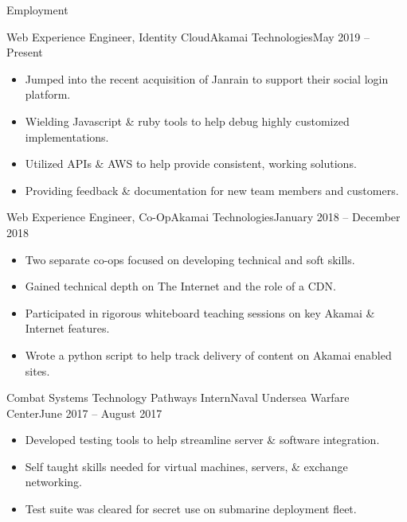 \documentclass[]{mcdowellcv}
\begin{document}
	\makeheader
	
	\begin{cvsection}{Employment}
		\begin{cvsubsection}{Web Experience Engineer, Identity Cloud}{Akamai Technologies}{May 2019 -- Present}
		\vspace{2mm}		
			\begin{itemize}
				\item Jumped into the recent acquisition of Janrain to support their social login platform.
				\item Wielding Javascript \& ruby tools to help debug highly customized implementations.
				\item Utilized APIs \& AWS to help provide consistent, working solutions.
				\item Providing feedback \& documentation for new team members and customers.
			\end{itemize}
		\end{cvsubsection}
		
		\begin{cvsubsection}{Web Experience Engineer, Co-Op}{Akamai Technologies}{January 2018 -- December 2018}
		\vspace{2mm}
			\begin{itemize}
				\item Two separate co-ops focused on developing technical and soft skills.
				\item Gained technical depth on The Internet and the role of a CDN.
				\item Participated in rigorous whiteboard teaching sessions on key Akamai \& Internet features.
				\item Wrote a python script to help track delivery of content on Akamai enabled sites.
			\end{itemize}
		\end{cvsubsection}
		
		\begin{cvsubsection}{Combat Systems Technology Pathways Intern}{Naval Undersea Warfare Center}{June 2017 -- August 2017}
		\vspace{2mm}
			\begin{itemize}
				\item Developed testing tools to help streamline server \& software integration.
				\item Self taught skills needed for virtual machines, servers, \& exchange networking.
				\item Test suite was cleared for secret use on submarine deployment fleet.
			\end{itemize}
		\end{cvsubsection}
		
	\end{cvsection}
	
\end{document}
